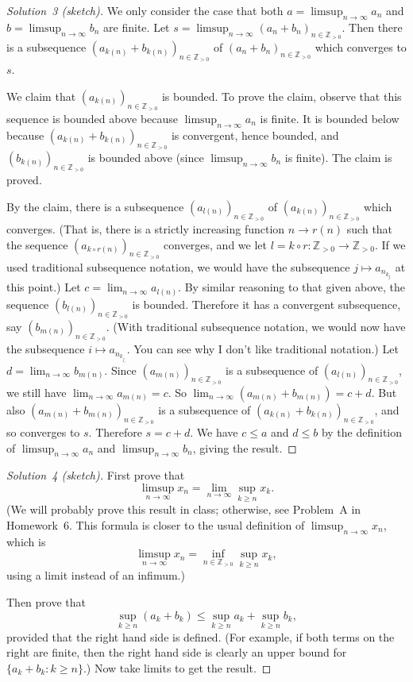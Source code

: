 \documentclass[10pt]{amsart}
\newcommand{\I}{\infty}
\newcommand{\N}{{\mathbb{Z}}_{> 0}}
\begin{document}
\begin{proof}[Solution~3 (sketch)]
We only consider the case that both
$a = \limsup_{n \to \I} a_n$
and $b = \limsup_{n \to \I} b_n$ are finite.
Let $s = \limsup_{n \to \I} (a_n + b_n)_{n \in \N}$.
Then there is a subsequence $(a_{k (n)} + b_{k (n)})_{n \in \N}$
of $(a_{n} + b_{n})_{n \in \N}$ which converges to $s$.

We claim that $(a_{k (n)})_{n \in \N}$ is bounded.
To prove the claim,
observe that this sequence is bounded above
because $\limsup_{n \to \I} a_n$ is finite.
It is bounded below
because $(a_{k (n)} + b_{k (n)})_{n \in \N}$ is convergent,
hence bounded,
and $(b_{k (n)})_{n \in \N}$ is bounded above
(since $\limsup_{n \to \I} b_n$ is finite).
The claim is proved.

By the claim, there is a subsequence $(a_{l (n)})_{n \in \N}$
of $(a_{k (n)})_{n \in \N}$ which converges.
(That is, there is a strictly increasing function
$n \to r (n)$ such that
the sequence $(a_{k \circ r (n)})_{n \in \N}$ converges, and we let
$l = k \circ r  \colon \N \to \N$.
If we used traditional subsequence notation, we would have
the subsequence $j \mapsto a_{n_{k_{j}}}$ at this point.)
Let $c = \lim_{n \to \I} a_{l (n)}$.
By similar reasoning to that given above,
the sequence $(b_{l (n)})_{n \in \N}$
is bounded.
Therefore it has a convergent subsequence,
say $(b_{m (n)})_{n \in \N}$.
(With traditional subsequence notation, we would now have
the subsequence $i \mapsto a_{n_{k_{j_i}}}$.
You can see why I don't like traditional notation.)
Let $d = \lim_{n \to \I} b_{m (n)}$.
Since $(a_{m (n)})_{n \in \N}$
is a subsequence of $(a_{l (n)})_{n \in \N}$,
we still have $\lim_{n \to \I} a_{m (n)} = c$.
So $\lim_{n \to \I} ( a_{m (n)} + b_{m (n)} ) = c + d$.
But also $(a_{m (n)} + b_{m (n)})_{n \in \N}$ is a subsequence of
$(a_{k (n)} + b_{k (n)})_{n \in \N}$, and so converges to $s$.
Therefore $s = c + d$.
We have $c \leq a$ and $d \leq b$ by the definition of
$\limsup_{n \to \I} a_n$ and $\limsup_{n \to \I} b_n$,
giving the result.
\end{proof}

\begin{proof}[Solution~4 (sketch)]
First prove that
\[
\limsup_{n \to \I} x_n = \lim_{n \to \I} \sup_{k \geq n} x_k.
\]
(We will probably prove this result in class; otherwise, see
Problem~A in Homework~6.
This formula is closer to the usual definition of
$\limsup_{n \to \I} x_n$, which is
\[
\limsup_{n \to \I} x_n = \inf_{n \in \N} \sup_{k \geq n} x_k,
\]
using a limit instead of an infimum.)

Then prove that
\[
\sup_{k \geq n} (a_k + b_k)
 \leq \sup_{k \geq n} a_k + \sup_{k \geq n} b_k,
\]
provided that the right hand side is defined.
(For example, if both terms on the right are finite, then the right hand
side is clearly an upper bound for $\{ a_k + b_k \colon k \geq n \}$.)
Now take limits to get the result.
\end{proof}
\end{document}
